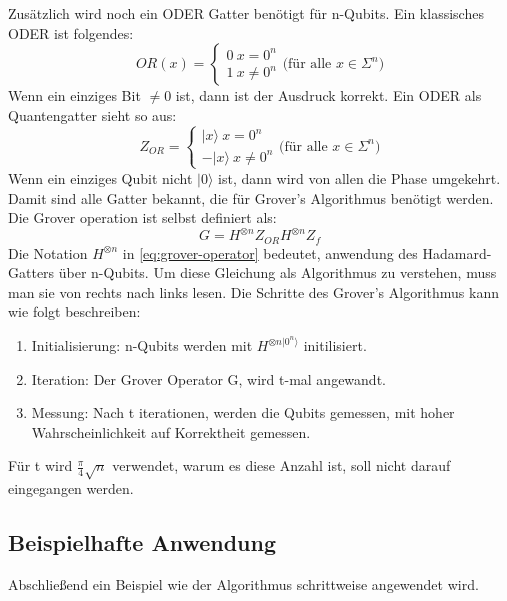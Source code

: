 Zusätzlich wird noch ein ODER Gatter benötigt für n-Qubits.
Ein klassisches ODER ist folgendes:
\begin{equation}
    OR(x)=
    \begin{cases}
        0\ x=0^n\\
        1\ x\neq0^n
    \end{cases}
    \text{(für alle }x\in \Sigma^n)
\end{equation}
Wenn ein einziges Bit $\neq 0$ ist, dann ist der Ausdruck korrekt.
Ein ODER als Quantengatter sieht so aus:
\begin{equation}
    Z_{OR}=
    \begin{cases}
        |x\rangle\ x=0^n\\
        -|x\rangle\ x\neq 0^n
    \end{cases}
    \text{(für alle }x\in \Sigma^n)
\end{equation}
Wenn ein einziges Qubit nicht $|0\rangle$ ist, dann wird von allen die Phase umgekehrt.
Damit sind alle Gatter bekannt, die für Grover's Algorithmus benötigt werden.
Die Grover operation ist selbst definiert als:
\begin{equation}
    G=H^{\otimes n}Z_{OR}H^{\otimes n}Z_f
    \label{eq:grover-operator}
\end{equation}
Die Notation $H^{\otimes n}$ in \ref{eq:grover-operator} bedeutet, anwendung des Hadamard-Gatters über n-Qubits.
Um diese Gleichung als Algorithmus zu verstehen, muss man sie von rechts nach links lesen.
Die Schritte des Grover's Algorithmus kann wie folgt beschreiben:
\begin{enumerate}
    \item Initialisierung: n-Qubits werden mit $H^{\otimes n|0^n\rangle}$ initilisiert.
    \item Iteration: Der Grover Operator G, wird t-mal angewandt.
    \item Messung: Nach t iterationen, werden die Qubits gemessen, mit hoher Wahrscheinlichkeit auf Korrektheit gemessen.
\end{enumerate}

Für t wird $\frac{\pi}{4}\sqrt{n}$ verwendet, warum es diese Anzahl ist, soll nicht darauf eingegangen werden.

\subsection{Beispielhafte Anwendung}
Abschließend ein Beispiel wie der Algorithmus schrittweise angewendet wird.

